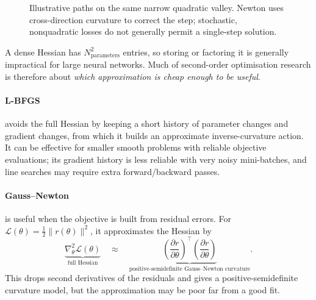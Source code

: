 \begin{figure}[htbp]
\centering
{}
\caption{Illustrative paths on the same narrow quadratic valley. Newton uses cross-direction curvature to correct the step; stochastic, nonquadratic losses do not generally permit a single-step solution.}
\end{figure}

A dense Hessian has $N_{\text{parameters}}^2$ entries, so storing or factoring it is generally impractical for large neural networks.
Much of second-order optimisation research is therefore about \emph{which approximation is cheap enough to be useful}.

\paragraph{L-BFGS} avoids the full Hessian by keeping a short history of parameter changes and gradient changes, from which it builds an approximate inverse-curvature action.
It can be effective for smaller smooth problems with reliable objective evaluations; its gradient history is less reliable with very noisy mini-batches, and line searches may require extra forward/backward passes.

\paragraph{Gauss--Newton} is useful when the objective is built from residual errors.
For $\mathcal L(\theta)=\frac12\|r(\theta)\|^2$, it approximates the Hessian by
\[
\underbrace{\nabla_\theta^2\mathcal L(\theta)}_{\text{full Hessian}}
\quad\approx\quad
\underbrace{\left(\frac{\partial r}{\partial\theta}\right)^\top
\left(\frac{\partial r}{\partial\theta}\right)}_{\text{positive-semidefinite Gauss--Newton curvature}}.
\]
This drops second derivatives of the residuals and gives a positive-semidefinite curvature model, but the approximation may be poor far from a good fit.

